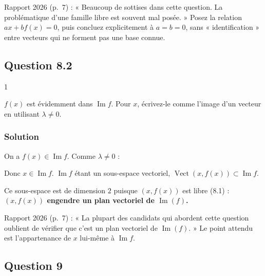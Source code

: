 \documentclass[11pt,a4paper]{article}
\newcommand{\equationajustee}[1]{%
  \sbox{\boiteequation}{$\displaystyle #1$}%
  \ifdim\wd\boiteequation>\linewidth
    \[\resizebox{\linewidth}{!}{\usebox{\boiteequation}}\]%
  \else
    \[#1\]%
  \fi}
\begin{document}
\begin{jury}

Rapport 2026 (p.~7) : « Beaucoup de sottises dans cette question. La problématique d'une famille libre est souvent mal posée. » Posez la relation \(ax+bf(x)=0\), puis concluez explicitement à \(a=b=0\), sans « identification » entre vecteurs qui ne forment pas une base connue.

\end{jury}

\hypertarget{question-8.2}{%
\subsection{Question 8.2}\label{question-8.2}}

\begin{indication}{1}

\(f(x)\) est évidemment dans \(\operatorname{Im}f\). Pour \(x\), écrivez-le comme l'image d'un vecteur en utilisant \(\lambda\neq0\).

\end{indication}

\hypertarget{solution-15}{%
\subsubsection{Solution}\label{solution-15}}

On a \(f(x)\in\operatorname{Im}f\). Comme \(\lambda\neq0\) :

\equationajustee{x=\frac1\lambda f^2(x)=f\!\left(\frac1\lambda f(x)\right).}

Donc \(x\in\operatorname{Im}f\). \(\operatorname{Im}f\) étant un sous-espace vectoriel, \(\operatorname{Vect}(x,f(x))\subset\operatorname{Im}f\).

Ce sous-espace est de dimension \(2\) puisque \((x,f(x))\) est libre (8.1) : \textbf{\((x,f(x))\) engendre un plan vectoriel de \(\operatorname{Im}(f)\).}

\begin{jury}

Rapport 2026 (p.~7) : « La plupart des candidats qui abordent cette question oublient de vérifier que c'est un plan vectoriel de \(\operatorname{Im}(f)\). » Le point attendu est l'appartenance de \(x\) lui-même à \(\operatorname{Im}f\).

\end{jury}

\hypertarget{question-9}{%
\subsection{Question 9}\label{question-9}}
\end{document}
